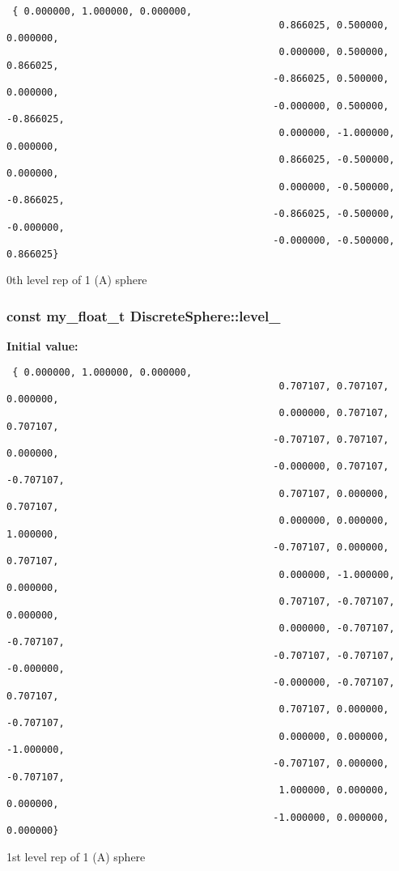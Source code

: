 \begin{Code}\begin{verbatim} { 0.000000, 1.000000, 0.000000,
                                               0.866025, 0.500000, 0.000000,
                                               0.000000, 0.500000, 0.866025,
                                              -0.866025, 0.500000, 0.000000,
                                              -0.000000, 0.500000, -0.866025,
                                               0.000000, -1.000000, 0.000000,
                                               0.866025, -0.500000, 0.000000,
                                               0.000000, -0.500000, -0.866025,
                                              -0.866025, -0.500000, -0.000000,
                                              -0.000000, -0.500000, 0.866025}
\end{verbatim}\end{Code}
0th level rep of 1 (A) sphere 

\subsubsection{\setlength{\rightskip}{0pt plus 5cm}const my\_\-float\_\-t \bf{Discrete\-Sphere::level\_}\hspace{0.3cm}{\tt  [static, private]}}\label{classSimSite3D_1_1DiscreteSphere_d3ff32a1e85a1c1f1e321fd09b0ec050}


\textbf{Initial value:}

\begin{Code}\begin{verbatim} { 0.000000, 1.000000, 0.000000,
                                               0.707107, 0.707107, 0.000000,
                                               0.000000, 0.707107, 0.707107,
                                              -0.707107, 0.707107, 0.000000,
                                              -0.000000, 0.707107, -0.707107,
                                               0.707107, 0.000000, 0.707107,
                                               0.000000, 0.000000, 1.000000,
                                              -0.707107, 0.000000, 0.707107,
                                               0.000000, -1.000000, 0.000000,
                                               0.707107, -0.707107, 0.000000,
                                               0.000000, -0.707107, -0.707107,
                                              -0.707107, -0.707107, -0.000000,
                                              -0.000000, -0.707107, 0.707107,
                                               0.707107, 0.000000, -0.707107,
                                               0.000000, 0.000000, -1.000000,
                                              -0.707107, 0.000000, -0.707107,
                                               1.000000, 0.000000, 0.000000,
                                              -1.000000, 0.000000, 0.000000}
\end{verbatim}\end{Code}
1st level rep of 1 (A) sphere 

